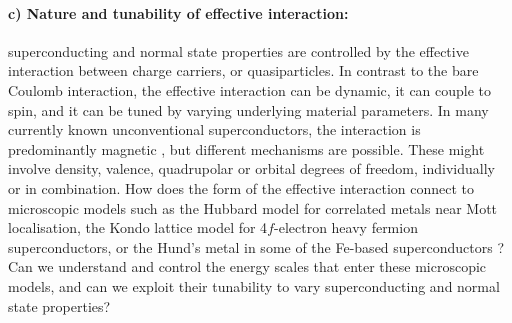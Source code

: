 \paragraph{c) Nature and tunability of effective interaction:} superconducting and normal state properties are controlled by the effective interaction between charge carriers, or quasiparticles. In contrast to the bare Coulomb interaction, the effective interaction can be dynamic, it can couple to spin, and it can be tuned by varying underlying material parameters. In many currently known unconventional superconductors, the interaction is predominantly magnetic \cite{monthoux07}, but different mechanisms are possible. These might involve density, valence, quadrupolar or orbital degrees of freedom, individually or in combination. How does the form of the effective interaction connect to microscopic models such as the Hubbard model for correlated metals near Mott localisation, the Kondo lattice model for 4$f$-electron heavy fermion superconductors, or the Hund's metal in some of the Fe-based superconductors \cite{georges13}? 
Can we understand and control the energy scales that enter these microscopic models,  and can we exploit their tunability to vary superconducting and normal state properties? 



